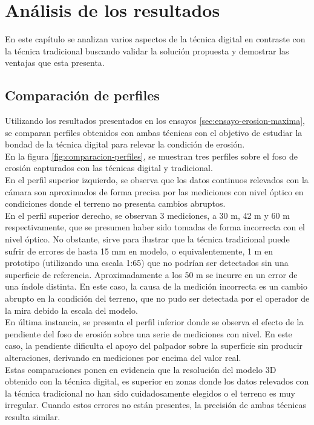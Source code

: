 \chapter{Análisis de los resultados}
En este capítulo se analizan varios aspectos de la técnica digital en contraste con la técnica tradicional buscando validar la solución propuesta y demostrar las ventajas que esta presenta.

\section{Comparación de perfiles}
Utilizando los resultados presentados en los ensayos \ref{sec:ensayo-erosion-maxima}, se comparan perfiles obtenidos con ambas técnicas con el objetivo de estudiar la bondad de la técnica digital para relevar la condición de erosión. \\
En la figura \ref{fig:comparacion-perfiles}, se muestran tres perfiles sobre el foso de erosión capturados con las técnicas digital y tradicional. \\
En el perfil superior izquierdo, se observa que los datos continuos relevados con la cámara son aproximados de forma precisa por las mediciones con nivel óptico en condiciones donde el terreno no presenta cambios abruptos. \\
En el perfil superior derecho, se observan 3 mediciones, a 30 m, 42 m y 60 m respectivamente, que se presumen haber sido tomadas de forma incorrecta con el nivel óptico. No obstante, sirve para ilustrar que la técnica tradicional puede sufrir de errores de hasta 15 mm en modelo, o equivalentemente, 1 m en prototipo (utilizando una escala 1:65) que no podrían ser detectados sin una superficie de referencia. Aproximadamente a los 50 m se incurre en un error de una índole distinta. En este caso, la causa de la medición incorrecta es un cambio abrupto en la condición del terreno, que no pudo ser detectada por el operador de la mira debido la escala del modelo. \\ 
En última instancia, se presenta el perfil inferior donde se observa el efecto de la pendiente del foso de erosión sobre una serie de mediciones con nivel. En este caso, la pendiente dificulta el apoyo del palpador sobre la superficie sin producir alteraciones, derivando en mediciones por encima del valor real. \\
Estas comparaciones ponen en evidencia que la resolución del modelo 3D obtenido con la técnica digital, es superior en zonas donde los datos relevados con la técnica tradicional no han sido cuidadosamente elegidos o el terreno es muy irregular. Cuando estos errores no están presentes, la precisión de ambas técnicas resulta similar.

